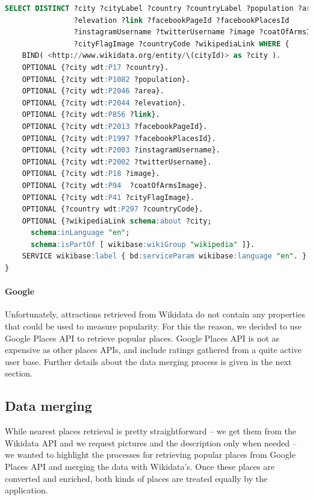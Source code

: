 \documentclass[a4paper, 11pt, parskip=half]{scrreprt}
\theoremstyle{definition}
\begin{document}
\begin{lstlisting}[language=sql, caption={SPARQL query for city detail retrieving.}, captionpos=b]
SELECT DISTINCT ?city ?cityLabel ?country ?countryLabel ?population ?area
                ?elevation ?link ?facebookPageId ?facebookPlacesId
                ?instagramUsername ?twitterUsername ?image ?coatOfArmsImage
                ?cityFlagImage ?countryCode ?wikipediaLink WHERE {
    BIND( <http://www.wikidata.org/entity/\(cityId)> as ?city ).
    OPTIONAL {?city wdt:P17 ?country}.
    OPTIONAL {?city wdt:P1082 ?population}.
    OPTIONAL {?city wdt:P2046 ?area}.
    OPTIONAL {?city wdt:P2044 ?elevation}.
    OPTIONAL {?city wdt:P856 ?link}.
    OPTIONAL {?city wdt:P2013 ?facebookPageId}.
    OPTIONAL {?city wdt:P1997 ?facebookPlacesId}.
    OPTIONAL {?city wdt:P2003 ?instagramUsername}.
    OPTIONAL {?city wdt:P2002 ?twitterUsername}.
    OPTIONAL {?city wdt:P18 ?image}.
    OPTIONAL {?city wdt:P94  ?coatOfArmsImage}.
    OPTIONAL {?city wdt:P41 ?cityFlagImage}.
    OPTIONAL {?country wdt:P297 ?countryCode}.
    OPTIONAL {?wikipediaLink schema:about ?city;
      schema:inLanguage "en";
      schema:isPartOf [ wikibase:wikiGroup "wikipedia" ]}.
    SERVICE wikibase:label { bd:serviceParam wikibase:language "en". }
}
\end{lstlisting}

\paragraph{Google}
Unfortunately, attractions retrieved from Wikidata do not contain any properties that could be used to measure popularity. For this the reason, we decided to use Google Places API to retrieve popular places. Google Places API is not as expensive as other places APIs, and include ratings gathered from a quite active user base. Further details about the data merging process is given in the next section.

\subsection{Data merging}

While nearest places retrieval is pretty straightforward -- we get them from the Wikidata API and we request pictures and the description only when needed -- we wanted to highlight the processes for retrieving popular places from Google Places API and merging the data with Wikidata's. Once these places are converted and enriched, both kinds of places are treated equally by the application.
\end{document}
